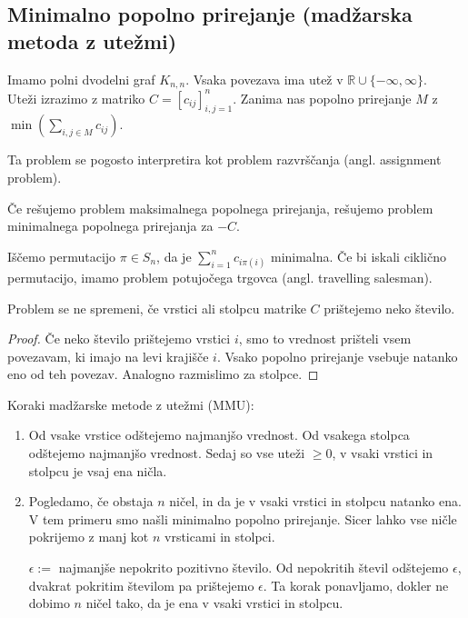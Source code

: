 \documentclass[11pt, a4paper]{article}
\begin{document}
    \subsection{Minimalno popolno prirejanje (madžarska metoda z utežmi)}

    Imamo polni dvodelni graf \(K_{n,n}\). Vsaka povezava ima utež v \(\mathbb{R} \cup \{- \infty, \infty \}\). \\
    Uteži izrazimo z matriko \(C = [c_{ij}]_{i,j=1}^n\). Zanima nas popolno prirejanje \(M\) z \(\min (\sum_{i,j \in M} c_{ij})\).

    \begin{remark}
        Ta problem se pogosto interpretira kot problem razvrščanja (angl. assignment problem).
    \end{remark}

    \begin{remark}
        Če rešujemo problem maksimalnega popolnega prirejanja, rešujemo problem minimalnega popolnega prirejanja za \(-C\).
    \end{remark}
    
    \begin{remark}
        Iščemo permutacijo \(\pi \in S_n\), da je \(\sum_{i=1}^n c_{i \pi(i)}\) minimalna. Če bi iskali ciklično permutacijo, imamo problem potujočega trgovca (angl. travelling salesman).
    \end{remark}

    \begin{proposition}
        Problem se ne spremeni, če vrstici ali stolpcu matrike \(C\) prištejemo neko število.
    \end{proposition}

    \begin{proof}
        Če neko število prištejemo vrstici \(i\), smo to vrednost prišteli vsem povezavam, ki imajo na levi krajišče \(i\). Vsako popolno prirejanje vsebuje natanko eno od teh povezav. Analogno razmislimo za stolpce.
    \end{proof}

    Koraki madžarske metode z utežmi (MMU):
    \begin{enumerate}[label=\arabic*. korak]
        \item Od vsake vrstice odštejemo najmanjšo vrednost. Od vsakega stolpca odštejemo najmanjšo vrednost. Sedaj so vse uteži \(\ge 0\), v vsaki vrstici in stolpcu je vsaj ena ničla.
        \item Pogledamo, če obstaja \(n\) ničel, in da je v vsaki vrstici in stolpcu natanko ena. V tem primeru smo našli minimalno popolno prirejanje. Sicer lahko vse ničle pokrijemo z manj kot \(n\) vrsticami in stolpci.
            \par
            \(\epsilon := \) najmanjše nepokrito pozitivno število. Od nepokritih števil odštejemo \(\epsilon\), dvakrat pokritim številom pa prištejemo \(\epsilon\). Ta korak ponavljamo, dokler ne dobimo \(n\) ničel tako, da je ena v vsaki vrstici in stolpcu.
    \end{enumerate}
\end{document}

